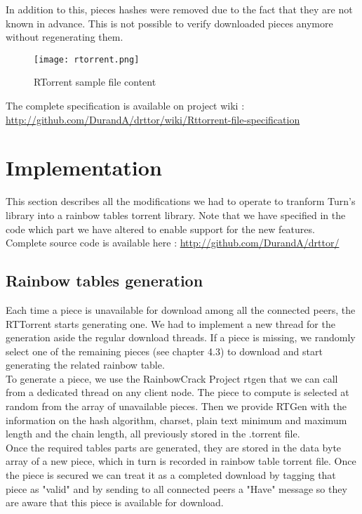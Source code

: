 \documentclass[a4paper]{article}
\begin{document}
{In addition to this, pieces hashes were removed due to the fact that they are not known in advance. This is not possible to verify downloaded pieces anymore without regenerating them.

\vspace{2mm}
\begin{figure}[H]
  \centering
    \texttt{[image: rtorrent.png]}
    \caption{RTorrent sample file content}
    \label{principle}
\end{figure}
\vspace{2mm}

The complete specification is available on project wiki : \url{http://github.com/DurandA/drttor/wiki/Rttorrent-file-specification}

\section{Implementation}

This section describes all the modifications we had to operate to tranform Turn's library into a rainbow tables torrent library. Note that we have specified in the code which part we have altered to enable support for the new features.\\

Complete source code is available here : \url{http://github.com/DurandA/drttor/}

\subsection{Rainbow tables generation}

Each time a piece is unavailable for download among all the connected peers, the RTTorrent starts generating one. We had to implement a new thread for the generation aside the regular download threads. If a piece is missing, we randomly select one of the remaining pieces (see chapter 4.3) to download and start generating the related rainbow table.\\

To generate a piece, we use the RainbowCrack Project rtgen that we can call from a dedicated thread on any client node. The piece to compute is selected at random from the array of unavailable pieces. Then we provide RTGen with the information on the hash algorithm, charset, plain text minimum and maximum length and the chain length, all previously stored in the .torrent file.\\

Once the required tables parts are generated, they are stored in the data byte array of a new piece, which in turn is recorded in rainbow table torrent file. Once the piece is secured we can treat it as a completed download by tagging that piece as "valid" and by sending to all connected peers a "Have" message so they are aware that this piece is available for download.

}
\end{document}
